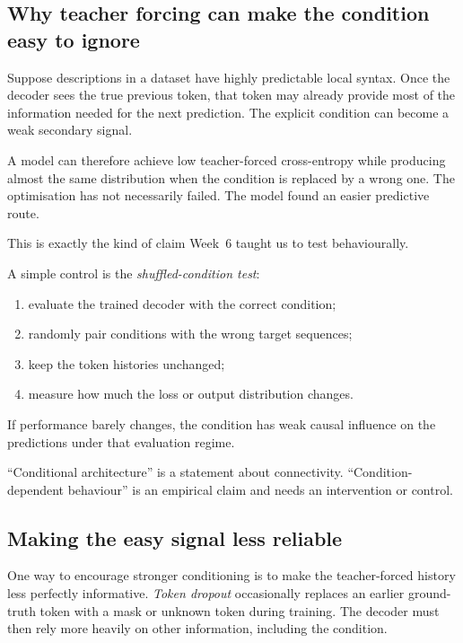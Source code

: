 \subsection{Why teacher forcing can make the condition easy to ignore}

Suppose descriptions in a dataset have highly predictable local syntax. Once the decoder sees the true previous token, that token may already provide most of the information needed for the next prediction. The explicit condition can become a weak secondary signal.

A model can therefore achieve low teacher-forced cross-entropy while producing almost the same distribution when the condition is replaced by a wrong one. The optimisation has not necessarily failed. The model found an easier predictive route.

This is exactly the kind of claim Week~6 taught us to test behaviourally.

A simple control is the \emph{shuffled-condition test}:
\begin{enumerate}[leftmargin=*]
  \item evaluate the trained decoder with the correct condition;
  \item randomly pair conditions with the wrong target sequences;
  \item keep the token histories unchanged;
  \item measure how much the loss or output distribution changes.
\end{enumerate}
If performance barely changes, the condition has weak causal influence on the predictions under that evaluation regime.

\begin{keyidea}
``Conditional architecture'' is a statement about connectivity. ``Condition-dependent behaviour'' is an empirical claim and needs an intervention or control.
\end{keyidea}

\subsection{Making the easy signal less reliable}

One way to encourage stronger conditioning is to make the teacher-forced history less perfectly informative. \emph{Token dropout} occasionally replaces an earlier ground-truth token with a mask or unknown token during training. The decoder must then rely more heavily on other information, including the condition.

